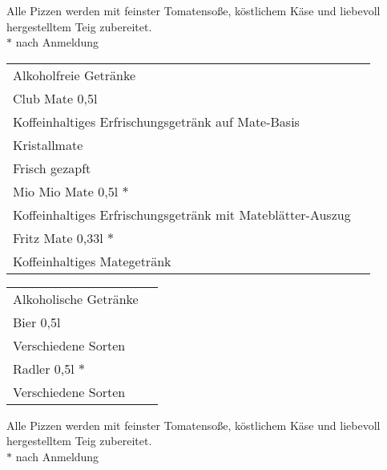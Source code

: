 \documentclass[12pt]{article}
\makeatletter
\newcommand*\ColText[1]{\textcolor{Goldenrod3}{#1}}
\newenvironment{Group}[1]
  {\noindent\begin{tabular*}{\textwidth}{@{}p{.8\linewidth}@{\extracolsep{\fill}}r@{}}
    {\fontsize{24}{29}\selectfont\ColText{#1}}\\[0.8em]}
  {\end{tabular*}}
\newcommand*\Entry[2]{%
  \sffamily#1 & #2}
\newcommand*\Expl[1]{%
  \hspace*{1em}\footnotesize #1}
\newcommand*\Footer[0]{%
\vfill
\noindent \small Alle Pizzen werden mit feinster Tomatensoße, köstlichem Käse und liebe\-voll hergestelltem  Teig zubereitet.\\
$\ast$ nach Anmeldung}
\makeatother
\begin{document}
\Footer

\pagebreak

\vspace{1em}

\begin{Group}{Alkoholfreie Getränke}
\Entry{Club Mate 0,5l}{} \\
\Expl{Koffeinhaltiges Erfrischungsgetränk auf Mate-Basis} \\
\Entry{Kristallmate}{} \\
\Expl{Frisch gezapft} \\
\Entry{Mio Mio Mate 0,5l $\ast$}{} \\
\Expl{Koffeinhaltiges Erfrischungsgetränk mit Mateblätter-Auszug} \\
\Entry{Fritz Mate 0,33l $\ast$}{} \\
\Expl{Koffeinhaltiges Mategetränk} \\
\end{Group}

\vspace{3em}

\begin{Group}{Alkoholische Getränke}
\Entry{Bier 0,5l}{} \\
\Expl{Verschiedene Sorten} \\
\Entry{Radler 0,5l $\ast$}{} \\
\Expl{Verschiedene Sorten} \\
\end{Group}

\Footer
\end{document}
